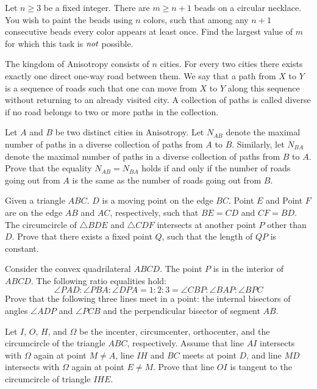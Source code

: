 \documentclass[11pt]{scrartcl}
\begin{document}
\begin{problem}[822921222405372]
Let $n\ge 3$ be a fixed integer. There are $m\ge n+1$ beads on a circular necklace. You wish to paint the beads using $n$ colors, such that among any $n+1$ consecutive beads every color appears at least once. Find the largest value of $m$ for which this task is $\emph{not}$ possible.
\end{problem}
\begin{problem}[9103148252094553273]
	The kingdom of Anisotropy consists of $n$ cities. For every two cities there exists exactly one direct one-way road between them. We say that a path from $X$ to $Y$ is a sequence of roads such that one can move from $X$ to $Y$ along this sequence without returning to an already visited city. A collection of paths is called diverse if no road belongs to two or more paths in the collection.

Let $A$ and $B$ be two distinct cities in Anisotropy. Let $N_{AB}$ denote the maximal number of paths in a diverse collection of paths from $A$ to $B$. Similarly, let $N_{BA}$ denote the maximal number of paths in a diverse collection of paths from $B$ to $A$. Prove that the equality $N_{AB} = N_{BA}$ holds if and only if the number of roads going out from $A$ is the same as the number of roads going out from $B$.
\end{problem}
\begin{problem}[117986541208663]
Given a triangle $ABC$. $D$ is a moving point on the edge $BC$. Point $E$ and Point $F$ are on the edge $AB$ and $AC$, respectively, such that $BE=CD$ and $CF=BD$. The circumcircle of $\triangle BDE$ and $\triangle CDF$ intersects at another point $P$ other than $D$. Prove that there exists a fixed point $Q$, such that the length of $QP$ is constant.
\end{problem}
\begin{problem}[915478364939250]
Consider the convex quadrilateral $ABCD$. The point $P$ is in the interior of $ABCD$. The following ratio equalities hold:
\[\angle PAD:\angle PBA:\angle DPA=1:2:3=\angle CBP:\angle BAP:\angle BPC\]Prove that the following three lines meet in a point: the internal bisectors of angles $\angle ADP$ and $\angle PCB$ and the perpendicular bisector of segment $AB$.
\end{problem}
\begin{problem}[183354438240037]
Let $I$, $O$, $H$, and $\Omega$ be the incenter, circumcenter, orthocenter, and the circumcircle of the triangle $ABC$, respectively. Assume that line $AI$ intersects with $\Omega$ again at point $M\neq A$, line $IH$ and $BC$ meets at point $D$, and line $MD$ intersects with $\Omega$ again at point $E\neq M$. Prove that line $OI$ is tangent to the circumcircle of triangle $IHE$.
\end{problem}
\end{document}
